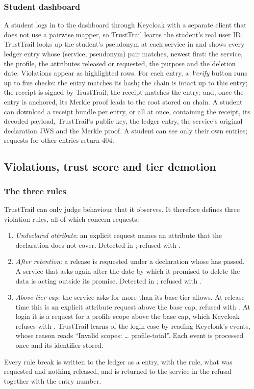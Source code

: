 \subsubsection{Student dashboard}
A student logs in to the dashboard through Keycloak with a separate client that does not use a pairwise mapper, so TrustTrail learns the student's real user ID. TrustTrail looks up the student's pseudonym at each service in  and shows every ledger entry whose (service, pseudonym) pair matches, newest first: the service, the profile, the attributes released or requested, the purpose and the deletion date. Violations appear as highlighted rows. For each entry, a \emph{Verify} button runs up to five checks: the entry matches its hash; the chain is intact up to this entry; the receipt is signed by TrustTrail; the receipt matches the entry; and, once the entry is anchored, its Merkle proof leads to the root stored on chain. A student can download a receipt bundle per entry, or all at once, containing the receipt, its decoded payload, TrustTrail's public key, the ledger entry, the service's original declaration JWS and the Merkle proof. A student can see only their own entries; requests for other entries return 404.

\subsection{Violations, trust score and tier demotion}
\label{sec:design-trust}

\subsubsection{The three rules}
TrustTrail can only judge behaviour that it observes. It therefore defines three violation rules, all of which concern requests:
\begin{enumerate}
\item \emph{Undeclared attribute}: an explicit request names an attribute that the declaration does not cover. Detected in ; refused with .
\item \emph{After retention}: a release is requested under a declaration whose  has passed. A service that asks again after the date by which it promised to delete the data is acting outside its promise. Detected in ; refused with .
\item \emph{Above tier cap}: the service asks for more than its base tier allows. At release time this is an explicit attribute request above the base cap, refused with . At login it is a request for a profile scope above the base cap, which Keycloak refuses with . TrustTrail learns of the login case by reading Keycloak's  events, whose reason reads ``Invalid scopes: \ldots{} profile-total''. Each event is processed once and its identifier stored.
\end{enumerate}
Every rule break is written to the ledger as a  entry, with the rule, what was requested and nothing released, and is returned to the service in the refusal together with the entry number.

